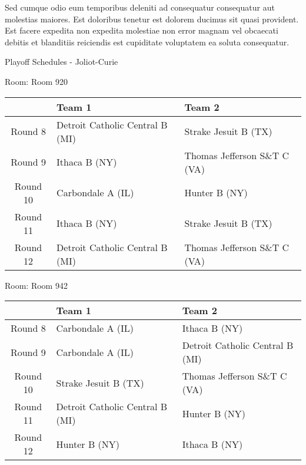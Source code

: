 \documentclass{article}%
\begin{document}
\newline%
Sed cumque odio eum temporibus deleniti ad consequatur consequatur aut molestias maiores. Est doloribus tenetur est dolorem ducimus sit quasi provident. Est facere expedita non expedita molestiae non error magnam vel obcaecati debitis et blanditiis reiciendis est cupiditate voluptatem ea soluta consequatur.%
\newpage%
\begin{center}%
\begin{Huge}%
Playoff Schedules {-} Joliot{-}Curie%
\end{Huge}%
\end{center}%
\begin{flushleft}%
\begin{Large}%
Room: Room 920%
\end{Large}%
\end{flushleft}%
\begin{tabularx}{\textwidth}{|c|Y|Y|}%
\hline%
&Team 1&Team 2\\%
\hline%
Round 8&Detroit Catholic Central B (MI)&Strake Jesuit B (TX)\\%
Round 9&Ithaca B (NY)&Thomas Jefferson S\&T C (VA)\\%
Round 10&Carbondale A (IL)&Hunter B (NY)\\%
Round 11&Ithaca B (NY)&Strake Jesuit B (TX)\\%
Round 12&Detroit Catholic Central B (MI)&Thomas Jefferson S\&T C (VA)\\%
\hline%
\end{tabularx}%
\vspace*{8pt}%
\linebreak%
\begin{flushleft}%
\begin{Large}%
Room: Room 942%
\end{Large}%
\end{flushleft}%
\begin{tabularx}{\textwidth}{|c|Y|Y|}%
\hline%
&Team 1&Team 2\\%
\hline%
Round 8&Carbondale A (IL)&Ithaca B (NY)\\%
Round 9&Carbondale A (IL)&Detroit Catholic Central B (MI)\\%
Round 10&Strake Jesuit B (TX)&Thomas Jefferson S\&T C (VA)\\%
Round 11&Detroit Catholic Central B (MI)&Hunter B (NY)\\%
Round 12&Hunter B (NY)&Ithaca B (NY)\\%
\hline%
\end{tabularx}%
\end{document}
